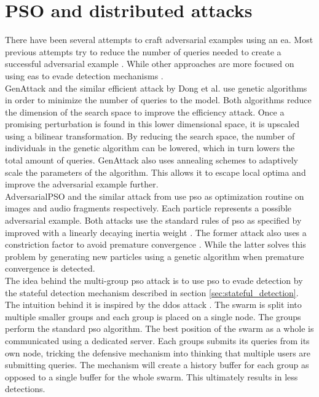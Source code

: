 \section{PSO and distributed attacks}
There have been several attempts to craft adversarial examples using an \gls{ea}. Most previous attempts try to reduce the number of queries needed to create a successful adversarial example \cite{genattack,dong2019efficient,mosli2019they,audio_pso}. While other approaches are more focused on using \glspl{ea} to evade detection mechanisms \cite{suryanto2020}.\\

GenAttack \cite{genattack} and the similar efficient attack by Dong et al. \cite{dong2019efficient} use genetic algorithms in order to minimize the number of queries to the model. Both algorithms reduce the dimension of the search space to improve the efficiency attack. Once a promising perturbation is found in this lower dimensional space, it is upscaled using a bilinear transformation. By reducing the search space, the number of individuals in the genetic algorithm can be lowered, which in turn lowers the total amount of queries. GenAttack also uses annealing schemes to adaptively scale the parameters of the algorithm. This allows it to escape local optima and improve the adversarial example further. \\

AdversarialPSO \cite{mosli2019they} and the similar attack from \cite{audio_pso} use \gls{pso} as optimization routine on images and audio fragments respectively. Each particle represents a possible adversarial example. Both attacks use the standard rules of \gls{pso} as specified by \cite{pso} improved with a linearly decaying inertia weight \cite{inertia_weight}. The former attack also uses a constriction factor to avoid premature convergence \cite{constriction_factor}. While the latter solves this problem by generating new particles using a genetic algorithm when premature convergence is detected.\\

The idea behind the multi-group \gls{pso} attack \cite{suryanto2020} is to use \gls{pso} to evade detection by the stateful detection mechanism described in section \ref{sec:stateful_detection}. The intuition behind it is inspired by the \gls{ddos} attack \cite{ddos}. The swarm is split into multiple smaller groups and each group is placed on a single node. The groups perform the standard \gls{pso} algorithm. The best position of the swarm as a whole is communicated using a dedicated server. Each groups submits its queries from its own node, tricking the defensive mechanism into thinking that multiple users are submitting queries. The mechanism will create a history buffer for each group as opposed to a single buffer for the whole swarm. This ultimately results in less detections.
